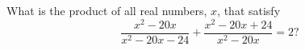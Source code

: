 What is the product of all real numbers, $x$, that satisfy \[\dfrac{x^2 - 20x}{x^2 - 20x - 24}+\dfrac{x^2 - 20x + 24}{x^2 - 20x}= 2?\]

